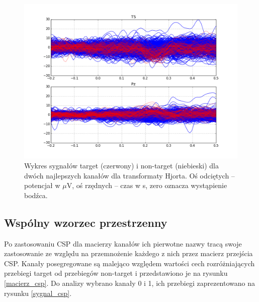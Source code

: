 \documentclass[licencjacka,openright]{pracamgr}
\begin{document}
\begin{figure}
\centering
\includegraphics[scale=0.55, trim=10mm 15mm 10mm 15mm, clip=True]{pics/sygnal_hjorth.png}
\caption{Wykres sygnałów target (czerwony) i non-target (niebieski) dla dwóch najlepszych kanałów dla transformaty Hjorta. Oś odciętych -- potencjał w  $\mu$V, oś rzędnych -- czas w s, zero oznacza wystąpienie bodźca.}
\label{sygnal_hjorth}
\end{figure}

\subsection{Wspólny wzorzec przestrzenny}

Po zastosowaniu CSP dla macierzy kanałów ich pierwotne nazwy tracą swoje zastosowanie ze względu na przemnożenie każdego z nich przez macierz przejścia CSP. Kanały posegregowane są malejąco względem wartości cech rozróżniających przebiegi target od przebiegów non-target i przedstawiono je na rysunku \ref{macierz_csp}. Do analizy wybrano kanały 0 i 1, ich przebiegi zaprezentowano na rysunku \ref{sygnal_csp}.
\end{document}
